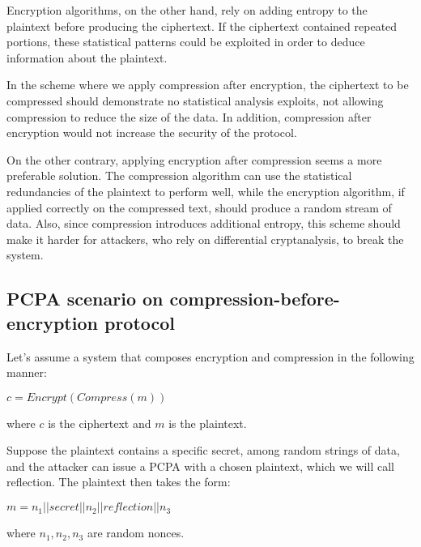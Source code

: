 Encryption algorithms, on the other hand, rely on adding entropy to the
plaintext before producing the ciphertext. If the ciphertext contained repeated
portions, these statistical patterns could be exploited in order to deduce
information about the plaintext.

In the scheme where we apply compression after encryption, the ciphertext to be
compressed should demonstrate no statistical analysis exploits, not allowing
compression to reduce the size of the data. In addition, compression after
encryption would not increase the security of the protocol.

On the other contrary, applying encryption after compression seems a more
preferable solution. The compression algorithm can use the statistical
redundancies of the plaintext to perform well, while the encryption algorithm,
if applied correctly on the compressed text, should produce a random stream of
data. Also, since compression introduces additional entropy, this scheme
should make it harder for attackers, who rely on differential cryptanalysis,
to break the system.

\subsection{PCPA scenario on compression-before-encryption protocol}

Let's assume a system that composes encryption and compression in the following
manner:

\begin{math}c = Encrypt(Compress(m))\end{math}

where \begin{math}c\end{math} is the ciphertext and \begin{math}m\end{math} is
the plaintext.

Suppose the plaintext contains a specific secret, among random strings of data,
and the attacker can issue a PCPA with a chosen plaintext, which we will call
reflection. The plaintext then takes the form:

\begin{math}m = n_1 || secret || n_2 || reflection || n_3\end{math}

where \begin{math}n_1, n_2, n_3\end{math} are random nonces.

